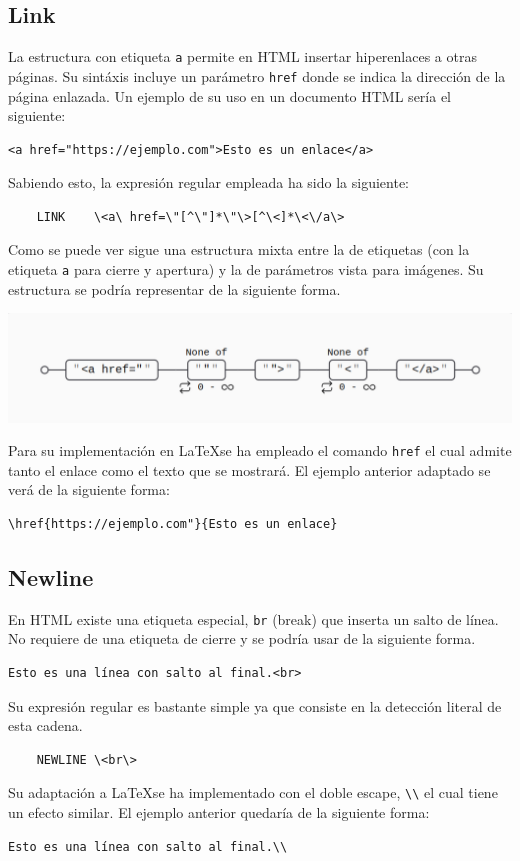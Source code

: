\documentclass[12pt]{article}
\begin{document}
\subsection{Link}
La estructura con etiqueta \verb|a| permite en HTML insertar hiperenlaces a otras páginas. Su sintáxis incluye un parámetro \verb|href| donde se indica la dirección de la página enlazada. Un ejemplo de su uso en un documento HTML sería el siguiente:
\begin{verbatim}
<a href="https://ejemplo.com">Esto es un enlace</a>
\end{verbatim}
Sabiendo esto, la expresión regular empleada ha sido la siguiente:
\begin{verbatim}
    LINK    \<a\ href=\"[^\"]*\"\>[^\<]*\<\/a\>
\end{verbatim}
Como se puede ver sigue una estructura mixta entre la de etiquetas (con la etiqueta \verb|a| para cierre y apertura) y la de parámetros vista para imágenes. Su estructura se podría representar de la siguiente forma.

\begin{center}\includegraphics[width=15cm]{./images/image3.png}\end{center}

Para su implementación en \LaTeX se ha empleado el comando \verb|href| el cual admite tanto el enlace como el texto que se mostrará. El ejemplo anterior adaptado se verá de la siguiente forma:
\begin{verbatim}
\href{https://ejemplo.com"}{Esto es un enlace}
\end{verbatim}

\subsection{Newline}
En  HTML existe una etiqueta especial, \verb|br| (break) que inserta un salto de línea. No requiere de una etiqueta de cierre y se podría usar de la siguiente forma.
\begin{verbatim}
Esto es una línea con salto al final.<br>
\end{verbatim}
Su expresión regular es bastante simple ya que consiste en la detección literal de esta cadena.
\begin{verbatim}
    NEWLINE \<br\>
\end{verbatim}
Su adaptación a \LaTeX se ha implementado con el doble escape, \verb|\\| el cual tiene un efecto similar. El ejemplo anterior quedaría de la siguiente forma:
\begin{verbatim}
Esto es una línea con salto al final.\\
\end{verbatim}
\end{document}
